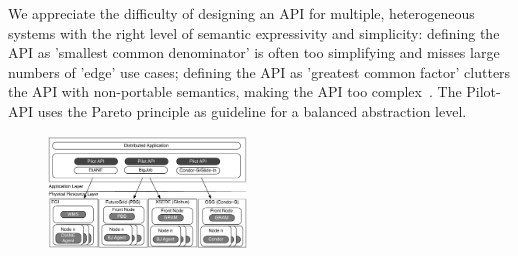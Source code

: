 \documentclass[conference]{IEEEtran}
\begin{document}
We appreciate the difficulty of designing an API for multiple, heterogeneous 
systems with the right level of semantic expressivity and simplicity: defining 
the API as 'smallest common denominator' is often too simplifying and misses 
large numbers of 'edge' use cases; defining the API as 'greatest common factor' 
clutters the API with non-portable semantics, making the API too 
complex~\cite{leaky_abstractions}. The Pilot-API uses the Pareto principle as 
guideline for a balanced abstraction level.


\begin{figure}[t]
    \begin{center}
    \up
    \includegraphics[width=0.47\textwidth]{../figures/distributed_pilot_job.pdf}
    \caption{\label{fig:figures_distributed_pilot_job}}
  \end{center}
    
\end{figure}




\end{document}
